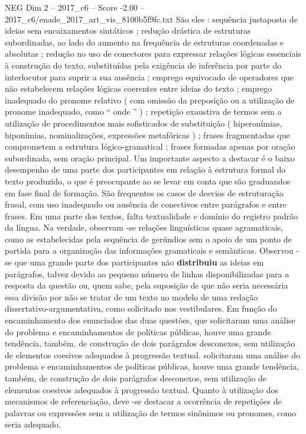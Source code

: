 \begin{textsample}{NEG Dim 2 – 2017\_c6 – Score -2.00 – 2017\_c6/enade\_2017\_art\_vis\_8100b5f9fc.txt}
São eles : sequência justaposta de ideias sem encaixamentos sintáticos ; redução drástica de estruturas subordinadas, ao lado do aumento na frequência de estruturas coordenadas e absolutas ; redução no uso de conectores para expressar relações lógicas essenciais à construção do texto, substituídas pela exigência de inferência por parte do interlocutor para suprir a sua ausência ; emprego equivocado de operadores que não estabelecem relações lógicas coerentes entre ideias do texto ; emprego inadequado do pronome relativo ( com omissão da preposição ou a utilização de pronome inadequado, como “ onde ” ) ; repetição exaustiva de termos sem a utilização de procedimentos mais sofisticados de substituição ( hiperonímias, hiponímias, nominalizações, expressões metafóricas ) ; frases fragmentadas que comprometem a estrutura lógico-gramatical ; frases formadas apenas por oração subordinada, sem oração principal.
Um importante aspecto a destacar é o baixo desempenho de uma parte dos participantes em relação à estrutura formal do texto produzido, o que é preocupante ao se levar em conta que são graduandos em fase final de formação.
São frequentes os casos de desvios de estruturação frasal, com uso inadequado ou ausência de conectivos entre parágrafos e entre frases.
Em uma parte dos textos, falta textualidade e domínio do registro padrão da língua.
Na verdade, observam -se relações linguísticas quase agramaticais, como as estabelecidas pela sequência de gerúndios sem o apoio de um ponto de partida para a organização das informações gramaticais e semânticas.
Observou -se que uma grande parte dos participantes não \textbf{distribuiu} as ideias em parágrafos, talvez devido ao pequeno número de linhas disponibilizadas para a resposta da questão ou, quem sabe, pela suposição de que não seria necessária essa divisão por não se tratar de um texto no modelo de uma redação dissertativo-argumentativa, como solicitado nos vestibulares.
Em função do encaminhamento dos enunciados das duas questões, que solicitaram uma análise do problema e encaminhamentos de políticas públicas, houve uma grande tendência, também, de construção de dois parágrafos desconexos, sem utilização de elementos coesivos adequados à progressão textual. solicitaram uma análise do problema e encaminhamentos de políticas públicas, houve uma grande tendência, também, de construção de dois parágrafos desconexos, sem utilização de elementos coesivos adequados à progressão textual.
Quanto à utilização dos mecanismos de referenciação, deve -se destacar a ocorrência de repetições de palavras ou expressões sem a utilização de termos sinônimos ou pronomes, como seria adequado.

\end{textsample}
